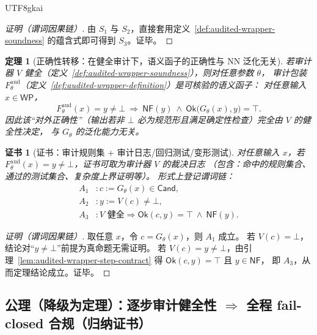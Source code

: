 \documentclass[12pt]{article}
\newtheorem{theorem}{定理}[section]
\newtheorem{Certificate}{证书}[section]
\begin{document}
\begin{CJK*}{UTF8}{gkai}
\begin{proof}[证明（谓词因果链）]
由 $S_1$ 与 $S_2$，直接套用定义~\ref{def:audited-wrapper-soundness} 的蕴含式即可得到 $S_3$。证毕。
\end{proof}

\begin{theorem}[正确性转移：在健全审计下，语义函子的正确性与 NN 泛化无关]
\label{thm:audited-wrapper-soundness}
若审计器 $V$ 健全（定义~\ref{def:audited-wrapper-soundness}），则对任意参数 $\theta$，
审计包装 $F^{\mathrm{aud}}_\theta$（定义~\ref{def:audited-wrapper-definition}）是可核验的语义函子：
对任意输入 $x\in\mathsf{WP}$，
\[
  F^{\mathrm{aud}}_\theta(x)=y\neq\bot\ \Longrightarrow\ \mathsf{NF}(y)\ \wedge\ \mathsf{Ok}\bigl(G_\theta(x),y\bigr)
    =\top.
\]
因此该“对外正确性”（输出若非 $\bot$ 必为规范形且满足确定性检查）完全由 $V$ 的健全性决定，
与 $G_\theta$ 的泛化能力无关。
\end{theorem}

\begin{Certificate}[证书：审计规则集 + 审计日志/回归测试/变形测试]
\label{cert:audited-wrapper-soundness}
对任意输入 $x$，若 $F^{\mathrm{aud}}_\theta(x)=y\neq\bot$，证书可取为审计器 $V$ 的裁决日志
（包含：命中的规则集合、通过的测试集合、复杂度上界证明等）。
形式上登记谓词链：
\[
\begin{aligned}
  A_1 &: c:=G_\theta(x)\in\mathsf{Cand},\\
  A_2 &: y:=V(c)\neq\bot,\\
  A_3 &: \text{$V$ 健全}\Rightarrow \mathsf{Ok}(c,y)=\top\ \wedge\ \mathsf{NF}(y).
\end{aligned}
\]
\end{Certificate}

\begin{proof}[证明（谓词因果链）]
取任意 $x$，令 $c=G_\theta(x)$，则 $A_1$ 成立。
若 $V(c)=\bot$，结论对“$y\neq\bot$”前提为真命题无需证明。
若 $V(c)=y\neq\bot$，由引理~\ref{lem:audited-wrapper-step-contract} 得 $\mathsf{Ok}(c,y)=\top$ 且 $y\in\mathsf{NF}$，
即 $A_3$，从而定理结论成立。证毕。
\end{proof}

\subsection{公理（降级为定理）：逐步审计健全性 $\Rightarrow$ 全程 fail-closed 合规（归纳证书）}
\label{sec:audited-wrapper-induction}


\end{CJK*}
\end{document}
